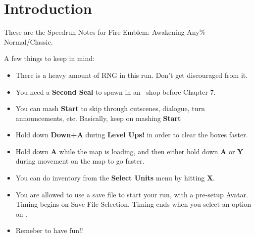 
\section*{Introduction}

These are the Speedrun Notes for Fire Emblem: Awakening Any\% Normal/Classic.

A few things to keep in mind:

\begin{itemize}
	\item There is a heavy amount of RNG in this run. Don't get discouraged from it.
	\item You need a \textbf{Second Seal} to spawn in an \anna\ shop before Chapter 7.
	\item You can mash \textbf{Start} to skip through cutscenes, dialogue, turn announcements, etc. Basically, keep on mashing \textbf{Start}
	\item Hold down \textbf{Down+A} during \textbf{Level Ups!} in order to clear the boxes faster.
	\item Hold down \textbf{A} while the map is loading, and then either hold down \textbf{A} or \textbf{Y} during movement on the map to go faster.
	\item You can do inventory from the \textbf{Select Units} menu by hitting \textbf{X}.
	\item You are allowed to use a save file to start your run, with a pre-setup Avatar. Timing begins on Save File Selection. Timing ends when you select an option on .
	\item Remeber to have fun!!
\end{itemize}